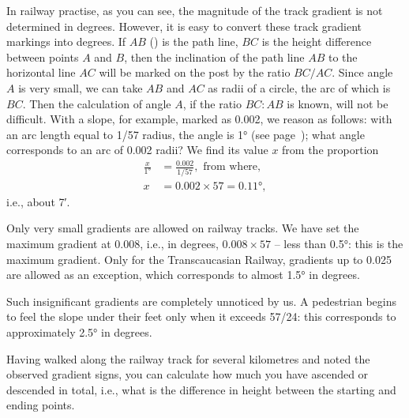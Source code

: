 In railway practise, as you can see, the magnitude of the track gradient is not determined in degrees. However, it is easy to convert these track gradient markings into degrees. If $AB$ () is the path line, $BC$ is the height difference between points $A$ and $B$, then the inclination of the path line $AB$ to the horizontal line $AC$ will be marked on the post by the ratio $BC/AC$. Since angle $A$ is very small, we can take $AB$ and $AC$ as radii of a circle, the arc of which is $BC$. Then the calculation of angle $A$, if the ratio $BC:AB$ is known, will not be difficult. With a slope, for example, marked as 0.002, we reason as follows: with an arc length equal to 1/57 radius, the angle is \ang{1} (see page~\pageref{fig-062}); what angle corresponds to an arc of 0.002 radii? We find its value $x$ from the proportion 
\begin{align*}%
\frac{x}{\ang{1}} & = \frac{0.002}{1/57},\,\, \text{from where,}\\
x & = 0.002 \times 57 = \ang{0.11},
\end{align*}
i.e., about \ang{;7}.
 
Only very small gradients are allowed on railway tracks. We have set the maximum gradient at 0.008, i.e., in degrees, $0.008 \times 57$ -- less than \ang{0.5}: this is the maximum gradient. Only for the Transcaucasian Railway, gradients up to 0.025 are allowed as an exception, which corresponds to almost \ang{1.5} in degrees.

Such insignificant gradients are completely unnoticed by us. A pedestrian begins to feel the slope under their feet only when it exceeds 57/24: this corresponds to approximately \ang{2.5} in degrees.

Having walked along the railway track for several kilometres and noted the observed gradient signs, you can calculate how much you have ascended or descended in total, i.e., what is the difference in height between the starting and ending points.



